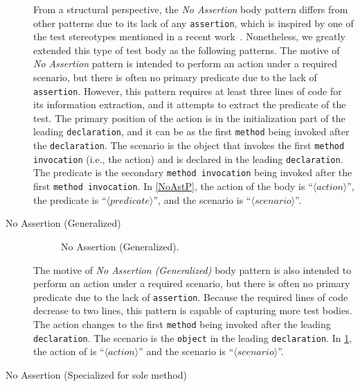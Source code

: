 \begin{description}
From a structural perspective, the \textit{No Assertion} body pattern differs from other patterns due to its lack of any \texttt{assertion}, which is inspired by one of the test stereotypes mentioned in a recent work~\cite{li2018aiding}.
%
Nonetheless, we greatly extended this type of test body as the following patterns.
%
The motive of \textit{No Assertion} pattern is intended to perform an action under a required scenario, but there is often no primary predicate due to the lack of \texttt{assertion}.
%
However, this pattern requires at least three lines of code for its information extraction, and it attempts to extract the predicate of the test.
%
The primary position of the action is in the initialization part of the leading \texttt{declaration}, and it can be as the first \texttt{method} being invoked after the \texttt{declaration}.
%
The scenario is the object that invokes the first \texttt{method invocation} (i.e., the action) and is declared in the leading \texttt{declaration}.
%
The predicate is the secondary \texttt{method invocation} being invoked after the first \texttt{method invocation}.
%
In \cref{NoAstP}, the action of the body is \enquote{$\langle action \rangle$}, the predicate is \enquote{$\langle predicate \rangle$}, and the scenario is \enquote{$\langle scenario \rangle$}.


\item[No Assertion (Generalized)] 

\begin{figure}[htbp]
\centering
    \begin{subfigure}{0.7\textwidth}
    \end{subfigure}
\caption{No Assertion (Generalized).}
\label{NoAstP_any}
\end{figure}

The motive of \textit{No Assertion (Generalized)} body pattern is also intended to perform an action under a required scenario, but there is often no primary predicate due to the lack of \texttt{assertion}.
%
Because the required lines of code decrease to two lines, this pattern is capable of capturing more test bodies.
%
The action changes to the first \texttt{method} being invoked after the leading \texttt{declaration}.
%
The scenario is the \texttt{object} in the leading \texttt{declaration}.
%
In \cref{NoAstP_any}, the action of is \enquote{$\langle action \rangle$} and the scenario is \enquote{$\langle scenario \rangle$}.


\item[No Assertion (Specialized for sole method)]


\end{description}
